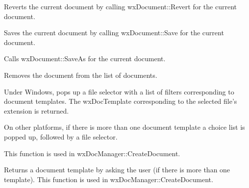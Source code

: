 Reverts the current document by calling wxDocument::Revert for the current document.


\label{wxdocmanageronfilesave}


Saves the current document by calling wxDocument::Save for the current document.


\label{wxdocmanageronfilesaveas}


Calls wxDocument::SaveAs for the current document.


\label{wxdocmanagerremovedocument}


Removes the document from the list of documents.


\label{wxdocmanagerselectdocumentpath}


Under Windows, pops up a file selector with a list of filters corresponding to document templates.
The wxDocTemplate corresponding to the selected file's extension is returned.

On other platforms, if there is more than one document template a choice list is popped up,
followed by a file selector.

This function is used in wxDocManager::CreateDocument.



\label{wxdocmanagerselectdocumenttype}


Returns a document template by asking the user (if there is more than one template).
This function is used in wxDocManager::CreateDocument.

